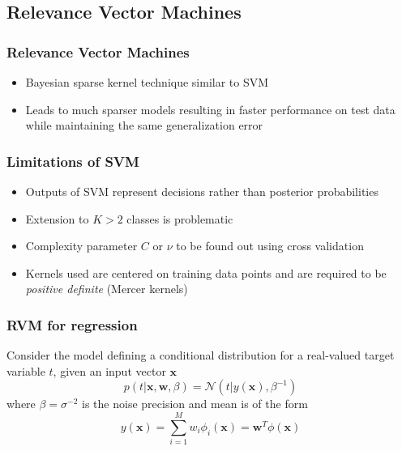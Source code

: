 \documentclass[t,14pt]{beamer}
\begin{document}
\subsection{Relevance Vector Machines}

\begin{frame}
  \frametitle{Relevance Vector Machines}
  \begin{itemize}
    \item {Bayesian sparse kernel technique similar to SVM}
    \item {
            Leads to much sparser models resulting in faster performance on 
            test data while maintaining the same generalization error
          }
  \end{itemize}
\end{frame}

\begin{frame}
  \frametitle{Limitations of SVM}
  \begin{itemize}
    \item {
            Outputs of SVM represent decisions rather than posterior 
            probabilities
          }
    \item {Extension to $K > 2$ classes is problematic}
    \item {
            Complexity parameter $C$ or $\nu$ to be found out using cross 
            validation
          }
    \item {
            Kernels used are centered on training data points and are required 
            to be \textit{positive definite} (Mercer kernels)
          }
  \end{itemize}
\end{frame}

\begin{frame}
  \frametitle{RVM for regression}
  Consider the model defining a conditional distribution for a real-valued 
  target variable $t$, given an input vector $\mathbf{x}$
  \begin{equation}
    p(t|\mathbf{x}, \mathbf{w} , \beta) = 
                                    \mathcal{N}(t|y(\mathbf{x}), \beta^{-1}) 
  \end{equation}
  where $\beta = \sigma^{-2}$ is the noise precision and mean is of the form
  \begin{equation}
    y(\mathbf{x}) = \sum\limits_{i=1}^M w_i \phi_i(\mathbf{x}) 
                    = \mathbf{w}^T\phi(\mathbf{x})
  \end{equation}
\end{frame}
\end{document}
